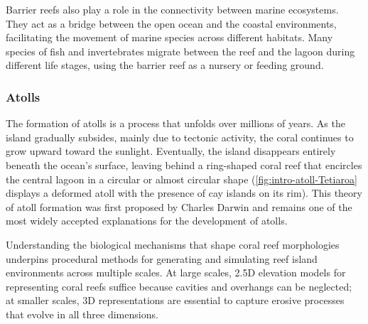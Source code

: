 Barrier reefs also play a role in the connectivity between marine ecosystems. They act as a bridge between the open ocean and the coastal environments, facilitating the movement of marine species across different habitats. Many species of fish and invertebrates migrate between the reef and the lagoon during different life stages, using the barrier reef as a nursery or feeding ground.

\subsubsection{Atolls}
The formation of atolls is a process that unfolds over millions of years. As the island gradually subsides, mainly due to tectonic activity, the coral continues to grow upward toward the sunlight. Eventually, the island disappears entirely beneath the ocean's surface, leaving behind a ring-shaped coral reef that encircles the central lagoon in a circular or almost circular shape (\cref{fig:intro-atoll-Tetiaroa} displays a deformed atoll with the presence of cay islands on its rim). This theory of atoll formation was first proposed by Charles Darwin and remains one of the most widely accepted explanations for the development of atolls.



\midConclusion

Understanding the biological mechanisms that shape coral reef morphologies underpins procedural methods for generating and simulating reef island environments across multiple scales. At large scales, 2.5D elevation models for representing coral reefs suffice because cavities and overhangs can be neglected; at smaller scales, 3D representations are essential to capture erosive processes that evolve in all three dimensions.

